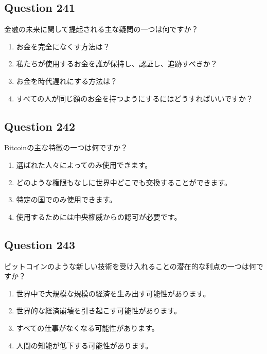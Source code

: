 \documentclass[12pt,a4paper]{article}
\begin{document}
\bigskip


\subsection*{Question 241}
金融の未来に関して提起される主な疑問の一つは何ですか？

\begin{enumerate}[label=\Alph*., leftmargin=*]
\item お金を完全になくす方法は？
\item 私たちが使用するお金を誰が保持し、認証し、追跡すべきか？
\item お金を時代遅れにする方法は？
\item すべての人が同じ額のお金を持つようにするにはどうすればいいですか？
\end{enumerate}

\bigskip


\subsection*{Question 242}
Bitcoinの主な特徴の一つは何ですか？

\begin{enumerate}[label=\Alph*., leftmargin=*]
\item 選ばれた人々によってのみ使用できます。
\item どのような権限もなしに世界中どこでも交換することができます。
\item 特定の国でのみ使用できます。
\item 使用するためには中央権威からの認可が必要です。
\end{enumerate}

\bigskip


\subsection*{Question 243}
ビットコインのような新しい技術を受け入れることの潜在的な利点の一つは何ですか？

\begin{enumerate}[label=\Alph*., leftmargin=*]
\item 世界中で大規模な規模の経済を生み出す可能性があります。
\item 世界的な経済崩壊を引き起こす可能性があります。
\item すべての仕事がなくなる可能性があります。
\item 人間の知能が低下する可能性があります。
\end{enumerate}
\end{document}
